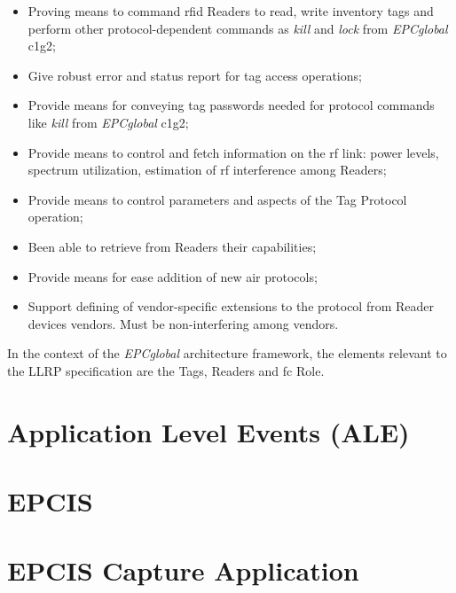 \begin{itemize}
    \setlength{\parskip}{0pt}
    \setlength{\itemsep}{0pt}
    \item Proving means to command \ac{rfid} Readers to read, write inventory tags and perform other protocol-dependent commands as \emph{kill} and \emph{lock} from \emph{EPCglobal} \ac{c1g2};
    \item Give robust error and status report for tag access operations;
    \item Provide means for conveying tag passwords needed for protocol commands like \emph{kill} from \emph{EPCglobal} \ac{c1g2};
    \item Provide means to control and fetch information on the \ac{rf} link: power levels, spectrum utilization, estimation of \ac{rf} interference among Readers;
    \item Provide means to control parameters and aspects of the Tag Protocol operation;
    \item Been able to retrieve from Readers their capabilities;
    \item Provide means for ease addition of new air protocols;
    \item Support defining of vendor-specific extensions to the protocol from Reader devices vendors. Must be non-interfering  among vendors.
\end{itemize}

In the context of the \emph{EPCglobal} architecture framework, the elements relevant to the LLRP specification are the Tags, Readers and \ac{fc} Role.



\section{Application Level Events (ALE)}

\section{EPCIS}


\section{EPCIS Capture Application}

